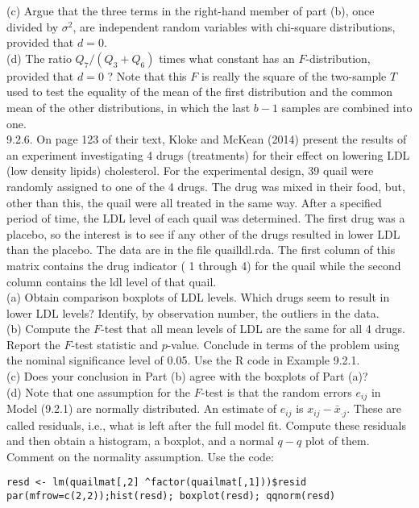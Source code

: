 (c) Argue that the three terms in the right-hand member of part (b), once divided by $\sigma^{2}$, are independent random variables with chi-square distributions, provided that $d=0$.\\
(d) The ratio $Q_{7} /\left(Q_{3}+Q_{6}\right)$ times what constant has an $F$-distribution, provided that $d=0$ ? Note that this $F$ is really the square of the two-sample $T$ used to test the equality of the mean of the first distribution and the common mean of the other distributions, in which the last $b-1$ samples are combined into one.\\
9.2.6. On page 123 of their text, Kloke and McKean (2014) present the results of an experiment investigating 4 drugs (treatments) for their effect on lowering LDL (low density lipids) cholesterol. For the experimental design, 39 quail were randomly assigned to one of the 4 drugs. The drug was mixed in their food, but, other than this, the quail were all treated in the same way. After a specified period of time, the LDL level of each quail was determined. The first drug was a placebo, so the interest is to see if any other of the drugs resulted in lower LDL than the placebo. The data are in the file quailldl.rda. The first column of this matrix contains the drug indicator ( 1 through 4) for the quail while the second column contains the ldl level of that quail.\\
(a) Obtain comparison boxplots of LDL levels. Which drugs seem to result in lower LDL levels? Identify, by observation number, the outliers in the data.\\
(b) Compute the $F$-test that all mean levels of LDL are the same for all 4 drugs. Report the $F$-test statistic and $p$-value. Conclude in terms of the problem using the nominal significance level of 0.05. Use the R code in Example 9.2.1.\\
(c) Does your conclusion in Part (b) agree with the boxplots of Part (a)?\\
(d) Note that one assumption for the $F$-test is that the random errors $e_{i j}$ in Model (9.2.1) are normally distributed. An estimate of $e_{i j}$ is $x_{i j}-\bar{x}_{\cdot j}$. These are called residuals, i.e., what is left after the full model fit. Compute these residuals and then obtain a histogram, a boxplot, and a normal $q-q$ plot of them. Comment on the normality assumption. Use the code:

\begin{verbatim}
resd <- lm(quailmat[,2] ^factor(quailmat[,1]))$resid
par(mfrow=c(2,2));hist(resd); boxplot(resd); qqnorm(resd)
\end{verbatim}

